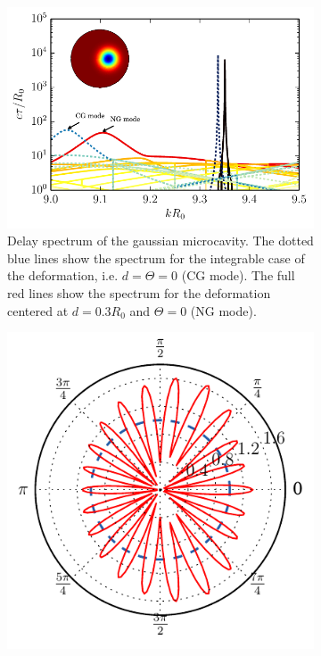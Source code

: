 \begin{figure}
 \centering
 \begin{subfigure}{0.6\textwidth}
  \centering
  \includegraphics[width=\textwidth]{figs/passive/spectrum_gaussian_inset.pdf}
  \caption[Delay spectrum of the Gaussian microcavity]
	  {Delay spectrum of the gaussian microcavity. The dotted blue lines show the spectrum
	  for the integrable case of the deformation, i.e. $d=\Theta=0$ (CG mode). The full red lines
	  show the spectrum for the deformation centered at $d=0.3R_0$ and $\Theta=0$ (NG mode).}
  \label{fig:passive.gaussian.numericalResults.spectrum}
 \end{subfigure}
 \begin{subfigure}{0.39\textwidth}
  \centering
  \includegraphics[width=\textwidth]{figs/passive/farField_gaussian.pdf}

\end{subfigure}
\end{figure}
